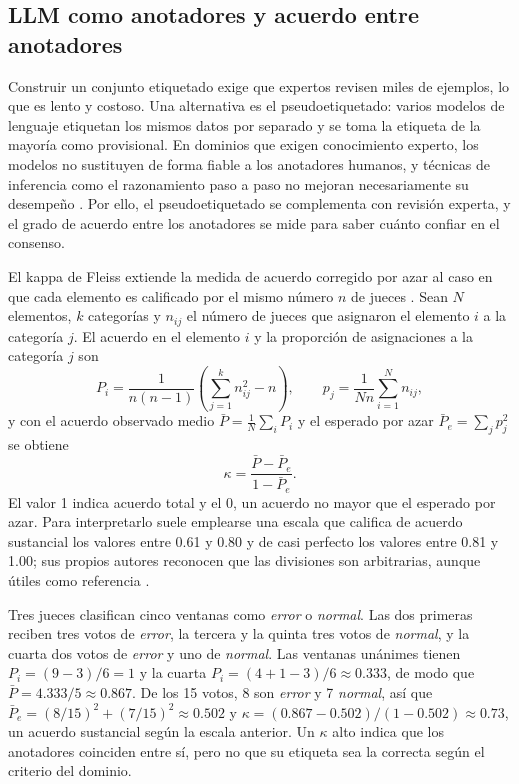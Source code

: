 \subsection{LLM como anotadores y acuerdo entre anotadores}\label{sec:mt_anotacion}

Construir un conjunto etiquetado exige que expertos revisen miles de ejemplos, lo que es lento y costoso. Una alternativa es el pseudoetiquetado: varios modelos de lenguaje etiquetan los mismos datos por separado y se toma la etiqueta de la mayoría como provisional. En dominios que exigen conocimiento experto, los modelos no sustituyen de forma fiable a los anotadores humanos, y técnicas de inferencia como el razonamiento paso a paso no mejoran necesariamente su desempeño \cite{tseng2025_expert_annotators}. Por ello, el pseudoetiquetado se complementa con revisión experta, y el grado de acuerdo entre los anotadores se mide para saber cuánto confiar en el consenso.

El kappa de Fleiss extiende la medida de acuerdo corregido por azar al caso en que cada elemento es calificado por el mismo número $n$ de jueces \cite{fleiss1971_kappa}. Sean $N$ elementos, $k$ categorías y $n_{ij}$ el número de jueces que asignaron el elemento $i$ a la categoría $j$. El acuerdo en el elemento $i$ y la proporción de asignaciones a la categoría $j$ son
\begin{equation}
P_i = \frac{1}{n(n-1)} \left( \sum_{j=1}^{k} n_{ij}^2 - n \right), \qquad p_j = \frac{1}{N n} \sum_{i=1}^{N} n_{ij},
\end{equation}
y con el acuerdo observado medio $\bar{P} = \frac{1}{N}\sum_i P_i$ y el esperado por azar $\bar{P}_e = \sum_j p_j^2$ se obtiene
\begin{equation}
\kappa = \frac{\bar{P} - \bar{P}_e}{1 - \bar{P}_e}.
\end{equation}
El valor 1 indica acuerdo total y el 0, un acuerdo no mayor que el esperado por azar. Para interpretarlo suele emplearse una escala que califica de acuerdo sustancial los valores entre 0.61 y 0.80 y de casi perfecto los valores entre 0.81 y 1.00; sus propios autores reconocen que las divisiones son arbitrarias, aunque útiles como referencia \cite{landis1977_kappa}.

Tres jueces clasifican cinco ventanas como \emph{error} o \emph{normal}. Las dos primeras reciben tres votos de \emph{error}, la tercera y la quinta tres votos de \emph{normal}, y la cuarta dos votos de \emph{error} y uno de \emph{normal}. Las ventanas unánimes tienen $P_i = (9 - 3)/6 = 1$ y la cuarta $P_i = (4 + 1 - 3)/6 \approx 0.333$, de modo que $\bar{P} = 4.333/5 \approx 0.867$. De los 15 votos, 8 son \emph{error} y 7 \emph{normal}, así que $\bar{P}_e = (8/15)^2 + (7/15)^2 \approx 0.502$ y $\kappa = (0.867 - 0.502)/(1 - 0.502) \approx 0.73$, un acuerdo sustancial según la escala anterior. Un $\kappa$ alto indica que los anotadores coinciden entre sí, pero no que su etiqueta sea la correcta según el criterio del dominio.

